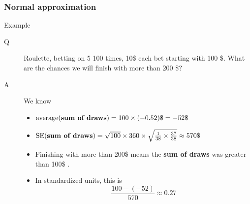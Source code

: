 \documentclass[handout]{beamer}
\begin{document}
   \begin{frame} \frametitle{Normal approximation}

   \begin{block}
   {Example}
   \begin{description}
   \item[Q] Roulette, betting on {\color{red} 5} 100 times, 10\$ each bet starting with 100 \$.
     What are the chances we will finish with more than 200 \$?
   \item[A] We know
     \begin{itemize}
     \item $\text{average({\bf sum of draws})} = 100 \times (-0.52)\$ = -52\$ $
     \item $\text{SE({\bf sum of draws})} = \sqrt{100} \times 360 \times \sqrt{\frac{1}{38} \times \frac{37}{38}} \approx 570\$ $
     \item Finishing with more than 200\$ means the {\bf sum of draws} was greater than 100\$ .
       \item In standardized units, this is
       $$
       \frac{100-(-52)}{570} \approx 0.27
       $$
     \end{itemize}
   \end{description}
   \end{block}
   \end{frame}

\end{document}
